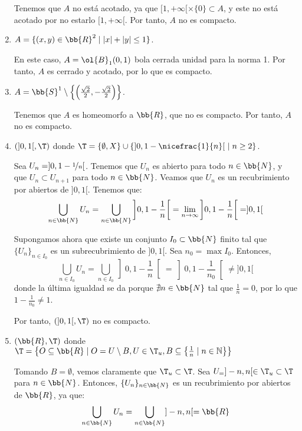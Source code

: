 \begin{ejercicio}
\begin{enumerate}
    Tenemos que $A$ no está acotado, ya que $[1,+\infty[\times \{0\} \subset A$,
    y este no está acotado por no estarlo $[1,+\infty[$. Por tanto, $A$ no es compacto.

    \item $A=\{(x, y) \in \bb{R}^2 \mid |x| + |y| \leq 1\}$.
    
    En este caso, $A=\ol{B}_1(0,1)$ bola cerrada unidad para la norma 1.
    Por tanto, $A$ es cerrado y acotado, por lo que es compacto.

    \item $A=\bb{S}^1 \setminus \left\{\left(\frac{\sqrt{2}}{2}, -\frac{\sqrt{2}}{2}\right)\right\}$.
    
    Tenemos que $A$ es homeomorfo a $\bb{R}$, que no es compacto. Por tanto, $A$ no es compacto.

    \item $(]0, 1[, \T) $ donde $ \T = \{\emptyset, X\} \cup \{]0, 1 - \nicefrac{1}{n}[~\mid n \geq 2\}$.
    
    Sea $U_n=]0, 1 - \nicefrac{1}{n}[$. Tenemos que $U_n$ es abierto para todo $n\in \bb{N}$, y que $U_n\subset U_{n+1}$ para todo $n\in \bb{N}$.
    Veamos que $U_n$ es un recubrimiento por abiertos de $]0,1[$. Tenemos que:
    \begin{equation*}
        \bigcup_{n\in \bb{N}} U_n = \bigcup_{n\in \bb{N}} \left]0, 1 - \frac{1}{n}\right[
            = \lim_{n\to \infty} \left]0, 1 - \frac{1}{n}\right[ = ]0,1[
    \end{equation*}

    Supongamos ahora que existe un conjunto $I_0\subset \bb{N}$ finito tal que $\{U_n\}_{n\in I_0}$ es un subrecubrimiento de $]0,1[$.
    Sea $n_0=\max I_0$. Entonces,
    \begin{equation*}
        \bigcup_{n\in I_0} U_n = \bigcup_{n\in I_0} \left]0, 1 - \frac{1}{n}\right[ = \left]0, 1 - \frac{1}{n_0}\right[ \neq ]0,1[
    \end{equation*}
    donde la última igualdad se da porque $\nexists n\in \bb{N}$ tal que $\frac{1}{n}=0$, por lo que $1-\frac{1}{n_0}\neq 1$.

    Por tanto, $(]0,1[, \T)$ no es compacto.
    
    \item $(\bb{R}, \T) $ donde $ \T = \left\{O \subseteq \bb{R} \mid O = U \setminus B, U \in \T_u, B \subseteq \left\{\frac{1}{n} \mid n \in \mathbb{N}\right\}\right\}$
    
    Tomando $B=\emptyset$, vemos claramente que $\T_u\subset \T$. Sea $U_=]-n,n[\in \T_u\subset \T$ para $n\in \bb{N}$. Entonces, $\{U_n\}_{n\in \bb{N}}$ es un
    recubrimiento por abiertos de $\bb{R}$, ya que:
    \begin{equation*}
        \bigcup_{n\in \bb{N}} U_n = \bigcup_{n\in \bb{N}} ]-n,n[ = \bb{R}
    \end{equation*}


\end{enumerate}
\end{ejercicio}
